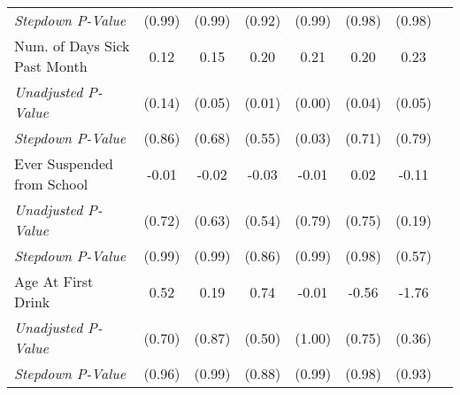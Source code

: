 \begin{tabular}{l c c c c c c c}
\quad \textit{Stepdown P-Value} & (0.99) & (0.99) & (0.92) & (0.99) & (0.98) & (0.98) \\
Num. of Days Sick Past Month & 0.12 & 0.15 & 0.20 & 0.21 & 0.20 & 0.23 \\
\quad \textit{Unadjusted P-Value} & (0.14) & (0.05) & (0.01) & (0.00) & (0.04) & (0.05) \\
\quad \textit{Stepdown P-Value} & (0.86) & (0.68) & (0.55) & (0.03) & (0.71) & (0.79) \\
Ever Suspended from School & -0.01 & -0.02 & -0.03 & -0.01 & 0.02 & -0.11 \\
\quad \textit{Unadjusted P-Value} & (0.72) & (0.63) & (0.54) & (0.79) & (0.75) & (0.19) \\
\quad \textit{Stepdown P-Value} & (0.99) & (0.99) & (0.86) & (0.99) & (0.98) & (0.57) \\
Age At First Drink & 0.52 & 0.19 & 0.74 & -0.01 & -0.56 & -1.76 \\
\quad \textit{Unadjusted P-Value} & (0.70) & (0.87) & (0.50) & (1.00) & (0.75) & (0.36) \\
\quad \textit{Stepdown P-Value} & (0.96) & (0.99) & (0.88) & (0.99) & (0.98) & (0.93) \\
\bottomrule
\end{tabular}
